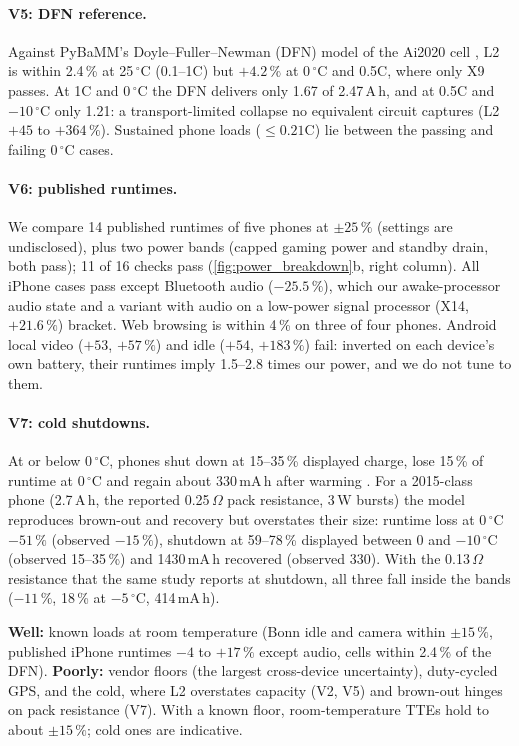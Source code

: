 \paragraph{V5: DFN reference.} Against PyBaMM's Doyle--Fuller--Newman (DFN) model \cite{SULZER21} of the Ai2020
cell \cite{AI20}, L2 is within 2.4\,\% at 25\,$^\circ$C (0.1--1C) but $+4.2\,\%$ at 0\,$^\circ$C and 0.5C, where
only X9 passes. At 1C and 0\,$^\circ$C the DFN delivers only 1.67 of 2.47\,A\,h, and at 0.5C and $-10\,^\circ$C
only 1.21: a transport-limited collapse no equivalent circuit captures (L2 $+45$ to $+364\,\%$). Sustained phone
loads ($\le0.21$C) lie between the passing and failing 0\,$^\circ$C cases.

\paragraph{V6: published runtimes.} We compare 14 published runtimes of five phones
\cite{APL14P,NBC22,NBC23,NBC24,LMAG22,GPX} at $\pm25\,\%$ (settings are undisclosed), plus two power bands
(capped gaming power and standby drain, both pass); 11 of 16 checks pass (\cref{fig:power_breakdown}b, right
column). All iPhone cases pass except Bluetooth audio ($-25.5\,\%$), which our awake-processor audio state and a
variant with audio on a low-power signal processor (X14, $+21.6\,\%$) bracket. Web browsing is within 4\,\% on
three of four phones. Android local video ($+53$, $+57\,\%$) and idle ($+54$, $+183\,\%$) fail: inverted on each
device's own battery, their runtimes imply 1.5--2.8 times our power, and we do not tune to them.

\paragraph{V7: cold shutdowns.} At or below 0\,$^\circ$C, phones shut down at 15--35\,\% displayed charge, lose
15\,\% of runtime at 0\,$^\circ$C and regain about 330\,mA\,h after warming \cite{LEE20}. For a 2015-class phone
(2.7\,A\,h, the reported 0.25\,$\Omega$ pack resistance, 3\,W bursts) the model reproduces brown-out and recovery
but overstates their size: runtime loss at 0\,$^\circ$C $-51\,\%$ (observed $-15\,\%$), shutdown at 59--78\,\%
displayed between 0 and $-10\,^\circ$C (observed 15--35\,\%) and 1430\,mA\,h recovered (observed 330). With the
0.13\,$\Omega$ resistance that the same study reports at shutdown, all three fall inside the bands ($-11\,\%$,
18\,\% at $-5\,^\circ$C, 414\,mA\,h).

\label{sec:wellpoor}
\begin{keybox}
\textbf{Well:} known loads at room temperature (Bonn idle and camera within $\pm15\,\%$, published iPhone runtimes
$-4$ to $+17\,\%$ except audio, cells within 2.4\,\% of the DFN). \textbf{Poorly:} vendor floors (the largest
cross-device uncertainty), duty-cycled GPS, and the cold, where L2 overstates capacity (V2, V5) and brown-out hinges
on pack resistance (V7). With a known floor, room-temperature TTEs hold to about $\pm15\,\%$; cold ones are indicative.
\end{keybox}
